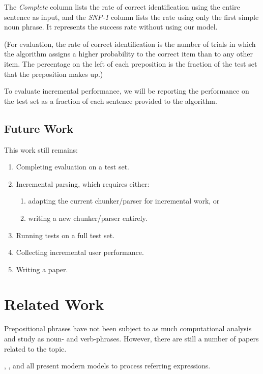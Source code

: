 \documentclass[letterpaper,10pt]{article}
\begin{document}
The \emph{Complete} column lists the rate of correct identification using the entire sentence as input, and the \emph{SNP-1} column lists the rate using only the first simple noun phrase. It represents the success rate without using our model.

(For evaluation, the rate of correct identification is the number of trials in which the algorithm assigns a higher probability to the correct item than to any other item. The percentage on the left of each preposition is the fraction of the test set that the preposition makes up.)

To evaluate incremental performance, we will be reporting the performance on the test set as a fraction of each sentence provided to the algorithm.

\subsection{Future Work}
This work still remains:
\begin{enumerate}[topsep=0pt,itemsep=-1ex,partopsep=1ex,parsep=1ex]
\item Completing evaluation on a test set.
\item Incremental parsing, which requires either:
\begin{enumerate}[topsep=0pt,itemsep=-1ex,partopsep=1ex,parsep=1ex]
\item adapting the current chunker/parser for incremental work, or
\item writing a new chunker/parser entirely.
\end{enumerate}
\item Running tests on a full test set.
\item Collecting incremental user performance.
\item Writing a paper.
\end{enumerate}


\section{Related Work}

Prepositional phrases have not been subject to as much computational analysis and study as noun- and verb-phrases. However, there are still a number of papers related to the topic. 

\citet{tellex2011understanding}, \citet{UW_RSE_ICML2012}, and \citet{artzi2013weakly} all present modern models to process referring expressions.
\end{document}
